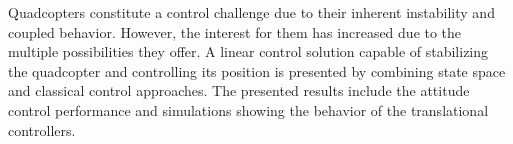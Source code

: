 
Quadcopters constitute a control challenge due to their inherent instability and coupled behavior. However, the interest for them has increased due to the multiple possibilities they offer. A linear control solution capable of stabilizing the quadcopter and controlling its position is presented by combining state space and classical control approaches. The presented results include the attitude control performance and simulations showing the behavior of the translational controllers.
